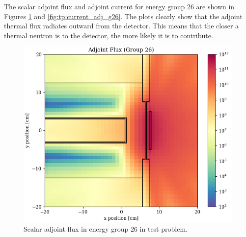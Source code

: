
The scalar adjoint flux and adjoint current for energy group 26 are shown in Figures \ref{fig:tp:scalar_flux_adj_g26} and \ref{fig:tp:current_adj_g26}.
The plots clearly show that the adjoint thermal flux radiates outward from the detector.
This means that the closer a thermal neutron is to the detector, the more likely it is to contribute.

\begin{figure}
  \begin{minipage}{0.49\linewidth}
    \centering
    \includegraphics[width=\linewidth]{content/testprob/scalar_flux_adj_g26.png}
    \caption{Scalar adjoint flux in energy group 26 in test problem.}
    \label{fig:tp:scalar_flux_adj_g26}
  \end{minipage}
  \hfill
  \begin{minipage}{0.49\linewidth}
    \centering

\end{minipage}
\end{figure}
